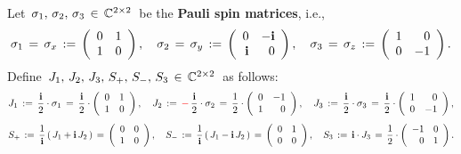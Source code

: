 \vskip 0.5cm
\begin{proposition}
\mbox{}
\vskip 0.1cm
\noindent
Let \,$\sigma_{1},\, \sigma_{2},\, \sigma_{3} \,\in\, \mathbb{C}^{2 \times 2}$\, be the \textbf{Pauli spin matrices}, i.e.,
\begin{equation*}
\sigma_{1} \,=\, \sigma_{x} \,:=\, \left(\begin{array}{cc} 0 & 1 \\ 1 & 0 \end{array}\right),
\quad
\sigma_{2} \,=\, \sigma_{y} \,:=\, \left(\begin{array}{rr} 0 & -\textnormal{\bf i} \\ \textnormal{\bf i} & 0 \end{array}\right),
\quad
\sigma_{3} \,=\, \sigma_{z} \,:=\, \left(\begin{array}{rr} 1 & 0 \\ 0 & -1 \end{array}\right).
\end{equation*}
Define \,$J_{1},\, J_{2},\, J_{3},\, S_{+},\, S_{-},\, S_{3} \,\in\, \mathbb{C}^{2 \times 2}$\, as follows:
\begin{equation*}
J_{1} \,:=\, \dfrac{\textnormal{\bf i}}{2}\cdot\sigma_{1} \,=\, \dfrac{\textnormal{\bf i}}{2}\cdot\left(\begin{array}{cc} 0 & 1 \\ 1 & 0 \end{array}\right),
\quad
J_{2} \,:=\, \mathbf{{\color{red}-}}\,\dfrac{\textnormal{\bf i}}{2}\cdot\sigma_{2} \,=\, \dfrac{1}{2}\cdot\left(\begin{array}{rr} 0 & -1 \\ 1 & 0 \end{array}\right),
\quad
J_{3} \,:=\, \dfrac{\textnormal{\bf i}}{2}\cdot\sigma_{3} \,=\, \dfrac{\textnormal{\bf i}}{2}\cdot\left(\begin{array}{rr} 1 & 0 \\ 0 & -1 \end{array}\right),
\end{equation*}
\begin{equation*}
S_{+} \,:=\, \dfrac{1}{\i}\left(\,J_{1} + \i\,J_{2}\,\right) \,=\, \left(\begin{array}{cc} 0 & 0 \\ 1 & 0 \end{array}\right),
\quad
S_{-} \,:=\, \dfrac{1}{\i}\left(\,J_{1} - \i\,J_{2}\,\right) \,=\, \left(\begin{array}{rr} 0 & 1 \\ 0 & 0 \end{array}\right),
\quad
S_{3} \,:=\, \i\cdot J_{3} \,=\, \dfrac{1}{2}\cdot\left(\begin{array}{rr} -1 & 0 \\ 0 & 1 \end{array}\right).

\end{equation*}
\end{proposition}
